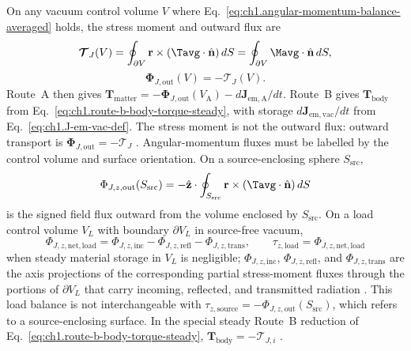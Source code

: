 On any vacuum control volume $V$ where Eq.~\eqref{eq:ch1.angular-momentum-balance-averaged} holds, the stress moment and outward flux are
\begin{equation}
\label{eq:ch1.stress-moment-integral}
\boldsymbol{\mathcal{T}}_J(V)
=\oint_{\partial V}\mathbf{r}\times(\Tavg\cdot\hat{\mathbf{n}})\,dS
=\oint_{\partial V}\Mavg\cdot\hat{\mathbf{n}}\,dS,
\end{equation}
\begin{equation}
\label{eq:ch1.outward-am-flux}
\boldsymbol{\Phi}_{J,\mathrm{out}}(V)
=-\boldsymbol{\mathcal{T}}_J(V).
\end{equation}
Route~A then gives $\mathbf{T}_{\mathrm{matter}}=-\boldsymbol{\Phi}_{J,\mathrm{out}}(V_{\mathrm{A}})-d\mathbf{J}_{\mathrm{em,A}}/dt$. Route~B gives $\mathbf{T}_{\mathrm{body}}$ from Eq.~\eqref{eq:ch1.route-b-body-torque-steady}, with storage $d\mathbf{J}_{\mathrm{em,vac}}/dt$ from Eq.~\eqref{eq:ch1.J-em-vac-def}. The stress moment is not the outward flux: outward transport is $\boldsymbol{\Phi}_{J,\mathrm{out}}=-\boldsymbol{\mathcal{T}}_J$ \cite{stratton1941,beth1936}. Angular-momentum fluxes must be labelled by the control volume and surface orientation. On a source-enclosing sphere $S_{\mathrm{src}}$,
\begin{equation}
\label{eq:ch1.am-flux-source-ledger}
\Phi_{J,z,\mathrm{out}}(S_{\mathrm{src}})
=-\hat{\mathbf{z}}\cdot\oint_{S_{\mathrm{src}}}\mathbf{r}\times(\Tavg\cdot\hat{\mathbf{n}})\,dS
\end{equation}
is the signed field flux outward from the volume enclosed by $S_{\mathrm{src}}$. On a load control volume $V_L$ with boundary $\partial V_L$ in source-free vacuum,
\begin{equation}
\label{eq:ch1.am-flux-load-ledger}
\Phi_{J,z,\mathrm{net,load}}
=\Phi_{J,z,\mathrm{inc}}-\Phi_{J,z,\mathrm{refl}}-\Phi_{J,z,\mathrm{trans}},
\qquad
\tau_{z,\mathrm{load}}=\Phi_{J,z,\mathrm{net,load}}
\end{equation}
when steady material storage in $V_L$ is negligible; $\Phi_{J,z,\mathrm{inc}}$, $\Phi_{J,z,\mathrm{refl}}$, and $\Phi_{J,z,\mathrm{trans}}$ are the axis projections of the corresponding partial stress-moment fluxes through the portions of $\partial V_L$ that carry incoming, reflected, and transmitted radiation \cite{beth1936,stratton1941}. This load balance is not interchangeable with $\tau_{z,\mathrm{source}}=-\Phi_{J,z,\mathrm{out}}(S_{\mathrm{src}})$, which refers to a source-enclosing surface. In the special steady Route~B reduction of Eq.~\eqref{eq:ch1.route-b-body-torque-steady}, $\mathbf{T}_{\mathrm{body}}=-\boldsymbol{\mathcal{T}}_{J,i}$ \cite{beth1936}.

